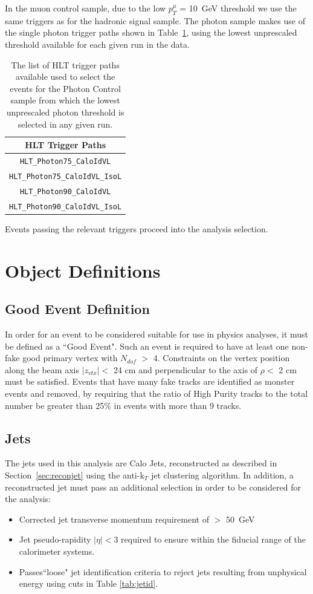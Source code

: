 In the muon control sample, due to the low $p^{\mu}_{T}$ = 10~GeV threshold we use the same triggers as for the hadronic signal sample. The photon sample makes use of the single photon trigger paths shown in Table~\ref{tab:photrig}, using the lowest unprescaled threshold available for each given run in the data.
\begin{table}[htbp]
\centering
\begin{tabular}{ c }
\hline
\hline
HLT Trigger Paths\\
\hline
\hline
\verb!HLT_Photon75_CaloIdVL!\\
\verb!HLT_Photon75_CaloIdVL_IsoL!\\ 
\verb!HLT_Photon90_CaloIdVL!\\
\verb!HLT_Photon90_CaloIdVL_IsoL!\\
\hline
\end{tabular}
\caption{\label{tab:photrig}The list of HLT trigger paths available used to select the events for the Photon Control sample from which the lowest unprescaled photon threshold is selected in any given run.}
\end{table}


Events passing the relevant triggers proceed into the analysis selection.

\section{Object Definitions}
\subsection{Good Event Definition}
\label{sec:good}
In order for an event to be considered suitable for use in physics analyses, it must be defined as a ``Good Event". Such an event is required to have at least one non-fake good primary vertex with $N_{dof}$ $>$ 4. Constraints on the vertex position along the beam axis $|z_{vtx}| <$ 24 cm and perpendicular to the axis of $\rho <$ 2 cm must be satisfied. Events that have many fake tracks are identified as monster events and removed, by requiring that the ratio of High Purity tracks to the total number be greater than 25\% in events with more than 9 tracks. 


\subsection{Jets}
\label{sec:jetsel}
The jets used in this analysis are Calo Jets, reconstructed as described in Section~\ref{sec:reconjet} using the anti-k$_{T}$ jet clustering algorithm. In addition, a reconstructed jet must pass an additional selection in order to be considered for the analysis:
\begin{itemize}
\item Corrected jet transverse momentum requirement of \Pt $>$ 50~GeV 
\item Jet pseudo-rapidity $|\eta| < 3$ required to ensure within the fiducial range of the calorimeter systems. 
\item Passes``loose" jet identification criteria to reject jets resulting from unphysical energy using cuts in Table \ref{tab:jetid}. 
\end{itemize}


